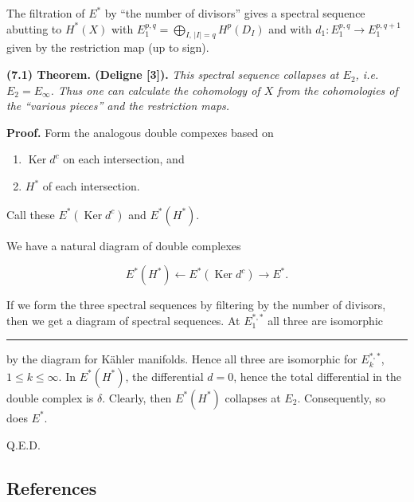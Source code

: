 \documentclass[
  english,
  a3paper,
  a3paper]{extarticle}
\begin{document}
The filtration of \(E^*\) by ``the number of divisors'' gives a spectral
sequence abutting to \(H^*(X)\) with
\(E_1^{p,q}=\bigoplus_{I,\,|I|=q}H^p(D_I)\) and with
\(d_1:E_1^{p,q}\to E_1^{p,q+1}\) given by the restriction map (up to
sign).

\textbf{(7.1) Theorem. (Deligne {[}3{]}).} \emph{This spectral sequence
collapses at \(E_2\), i.e.~\(E_2=E_\infty\). Thus one can calculate the
cohomology of \(X\) from the cohomologies of the ``various pieces'' and
the restriction maps.}

\textbf{Proof.} Form the analogous double compexes based on

\begin{enumerate}
\def\labelenumi{\arabic{enumi})}
\item
  \(\operatorname{Ker}d^c\) on each intersection, and
\item
  \(H^*\) of each intersection.
\end{enumerate}

Call these \(E^*(\operatorname{Ker}d^c)\) and \(E^*(H^*)\).

We have a natural diagram of double complexes

\[E^*(H^*)\longleftarrow E^*(\operatorname{Ker}d^c)\longrightarrow E^*.\]

If we form the three spectral sequences by filtering by the number of
divisors, then we get a diagram of spectral sequences. At \(E_1^{*,*}\)
all three are isomorphic

\clearpage



\par

\vspace{0.7mm}\hrule\vspace{1.6mm}

\fontsize{9}{11}\selectfont

by the diagram for Kähler manifolds. Hence all three are isomorphic for
\(E_k^{*,*}\), \(1\leq k\leq\infty\). In \(E^*(H^*)\), the differential
\(d=0\), hence the total differential in the double complex is
\(\delta\). Clearly, then \(E^*(H^*)\) collapses at \(E_2\).
Consequently, so does \(E^*\).

Q.E.D.

\subsection{References}\label{references}
\end{document}
